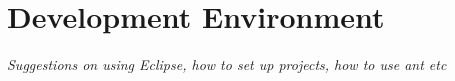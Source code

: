 \chapter{Development Environment}

{\em Suggestions on using Eclipse, how to set up projects, how to use ant etc}

